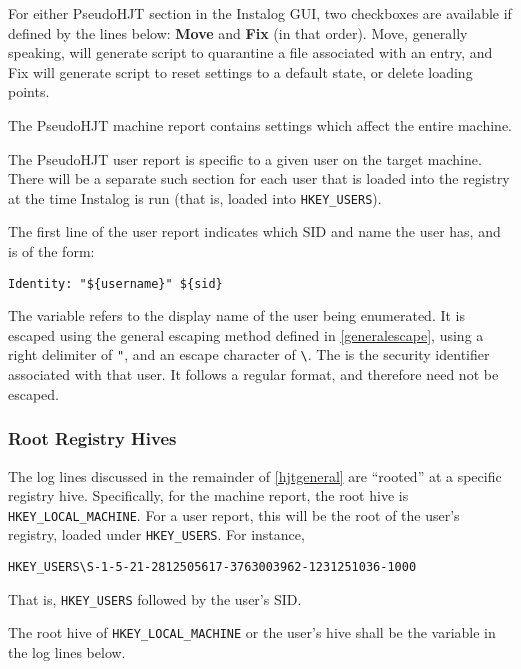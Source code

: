 For either PseudoHJT section in the Instalog GUI, two checkboxes are available
if defined by the lines below: \textbf{Move} and \textbf{Fix} (in that order).
Move, generally speaking, will generate script to quarantine a file associated
with an entry, and Fix will generate script to reset settings to a default
state, or delete loading points.

The PseudoHJT machine report contains settings which affect the entire machine.

The PseudoHJT user report is specific to a given user on the target machine.
There will be a separate such section for each user that is loaded into the
registry at the time Instalog is run (that is, loaded into \verb|HKEY_USERS|).

The first line of the user report indicates which SID and name the user has, and
is of the form:
\begin{verbatim}
Identity: "${username}" ${sid}
\end{verbatim}

The variable  refers to the display name of the user being
enumerated. It is escaped using the general escaping method defined in
\ref{generalescape}, using a right delimiter of \verb|"|, and an escape
character of \verb|\|. The  is the security identifier associated with
that user. It follows a regular format, and therefore need not be escaped.

\subsubsection{Root Registry Hives}
The log lines discussed in the remainder of \ref{hjtgeneral} are ``rooted'' at a
specific registry hive. Specifically, for the machine report, the root hive is
\verb|HKEY_LOCAL_MACHINE|. For a user report, this will be the root of the
user's registry, loaded under \verb|HKEY_USERS|. For instance,
\begin{verbatim}
HKEY_USERS\S-1-5-21-2812505617-3763003962-1231251036-1000
\end{verbatim}
That is, \verb|HKEY_USERS| followed by the user's SID.

The root hive of \verb|HKEY_LOCAL_MACHINE| or the user's hive shall be
the variable  in the log lines below.

